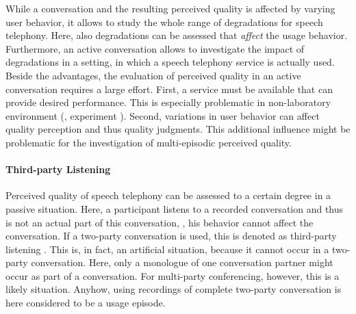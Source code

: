 While a conversation and the resulting perceived quality is affected by varying user behavior, it allows to study the whole range of degradations for speech telephony.
Here, also degradations can be assessed that \emph{affect} the usage behavior. %
Furthermore, an active conversation allows to investigate the impact of degradations in a setting, in which a speech telephony service is actually used.
Beside the advantages, the evaluation of perceived quality in an active conversation requires a large effort.
First, a service must be available that can provide desired performance.
This is especially problematic in non-laboratory environment (\cf, experiment ).
Second, variations in user behavior can affect quality perception and thus quality judgments.
This additional influence might be problematic for the investigation of multi-episodic perceived quality.

\paragraph*{Third-party Listening}
Perceived quality of speech telephony can be assessed  to a certain degree in a passive situation.
Here, a participant listens to a recorded conversation and thus is not an actual part of this conversation, \ie, his behavior cannot affect the conversation.
If a two-party conversation is used, this is denoted as third-party listening \citep[][p.~13]{itu-t_p.832:_2000}.
This is, in fact, an artificial situation, because it cannot occur in a two-party conversation.
Here, only a monologue of one conversation partner might occur as part of a conversation.
For multi-party conferencing, however, this is a likely situation.
Anyhow, using recordings of complete two-party conversation is here considered to be a usage episode.

